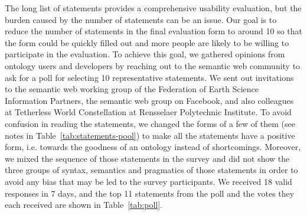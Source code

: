 The long list of statements provides a comprehensive usability evaluation, but the burden caused by the number of statements can be an issue. Our goal is to reduce the number of statements in the final evaluation form to around 10 so that the form could be quickly filled out and more people are likely to be willing to participate in the evaluation. To achieve this goal, we gathered opinions from ontology users and developers by reaching out to the semantic web community to ask for a poll for selecting 10 representative statements. We sent out invitations to the semantic web working group of the Federation of Earth Science Information Partners, the semantic web group on Facebook, and also colleagues at Tetherless World Constellation at Rensselaer Polytechnic Institute. To avoid confusion in reading the statements, we changed the forms of a few of them (see notes in Table~\ref{tab:statements-pool}) to make all the statements have a positive form, i.e. towards the goodness of an ontology instead of shortcomings. Moreover, we mixed the sequence of those statements in the survey and did not show the three groups of syntax, semantics and pragmatics of those statements in order to avoid any bias that may be led to the survey participants. We received 18 valid responses in 7 days, and the top 11 statements from the poll and the votes they each received are shown in Table~\ref{tab:poll}.
